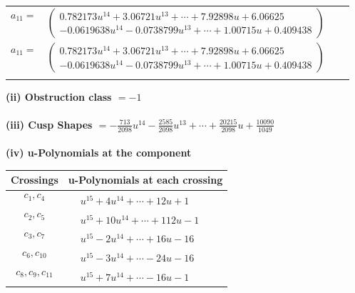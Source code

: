 \documentclass[1p]{elsarticle_modified}
\theoremstyle{definition}
\begin{document}
\begin{tabular}{m{7pt} m{180pt} m{7pt} m{180pt} }
\flushright $a_{11}=$&$\begin{pmatrix}0.782173 u^{14}+3.06721 u^{13}+\cdots+7.92898 u+6.06625\\-0.0619638 u^{14}-0.0738799 u^{13}+\cdots+1.00715 u+0.409438\end{pmatrix}$\\ \flushright $a_{11}=$&$\begin{pmatrix}0.782173 u^{14}+3.06721 u^{13}+\cdots+7.92898 u+6.06625\\-0.0619638 u^{14}-0.0738799 u^{13}+\cdots+1.00715 u+0.409438\end{pmatrix}$\\&\end{tabular}
\flushleft \textbf{(ii) Obstruction class $= -1$}\\~\\
\flushleft \textbf{(iii) Cusp Shapes $= -\frac{713}{2098} u^{14}-\frac{2585}{2098} u^{13}+\cdots+\frac{20215}{2098} u+\frac{10090}{1049}$}\\~\\
\newpage\renewcommand{\arraystretch}{1}
\flushleft \textbf{(iv) u-Polynomials at the component}\newline \\
\begin{tabular}{m{50pt}|m{274pt}}
Crossings & \hspace{64pt}u-Polynomials at each crossing \\
\hline $$\begin{aligned}c_{1},c_{4}\end{aligned}$$&$\begin{aligned}
&u^{15}+4 u^{14}+\cdots+12 u+1
\end{aligned}$\\
\hline $$\begin{aligned}c_{2},c_{5}\end{aligned}$$&$\begin{aligned}
&u^{15}+10 u^{14}+\cdots+112 u-1
\end{aligned}$\\
\hline $$\begin{aligned}c_{3},c_{7}\end{aligned}$$&$\begin{aligned}
&u^{15}-2 u^{14}+\cdots+16 u-16
\end{aligned}$\\
\hline $$\begin{aligned}c_{6},c_{10}\end{aligned}$$&$\begin{aligned}
&u^{15}-3 u^{14}+\cdots-24 u-16
\end{aligned}$\\
\hline $$\begin{aligned}c_{8},c_{9},c_{11}\end{aligned}$$&$\begin{aligned}
&u^{15}+7 u^{14}+\cdots-16 u-1
\end{aligned}$\\
\hline
\end{tabular}\\~\\
\end{document}
